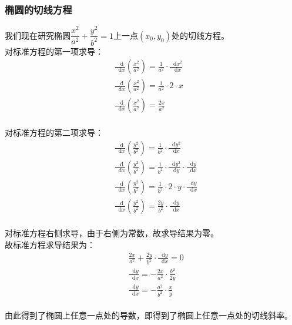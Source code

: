 \documentclass[UTF8]{ctexart}
\newcommand*{\dif}{\mathop{}\!\mathrm{d}}
\begin{document}
\newpage

\subsubsection{椭圆的切线方程}
    我们现在研究椭圆$\dfrac{x^2}{a^2}+\dfrac{y^2}{b^2}=1$上一点$(x_0,y_0)$处的切线方程。\\[5mm]
    对标准方程的第一项求导：
    \setcounter{equation}{0}
    \begin{align}
        &\frac{\dif}{\dif x}\left(\frac{x^2}{a^2}\right)=\frac{1}{a^2}\cdot\frac{\dif x^2}{\dif x}~~~~~~~~\\[4mm]
        &\frac{\dif}{\dif x}\left(\frac{x^2}{a^2}\right)=\frac{1}{a^2}\cdot 2\cdot x\\[4mm]
        &\frac{\dif}{\dif x}\left(\frac{x^2}{a^2}\right)=\frac{2x}{a^2}
    \end{align}\\
    对标准方程的第二项求导：
    \setcounter{equation}{0}
    \begin{align}
        &\frac{\dif}{\dif x}\left(\frac{y^2}{b^2}\right)=\frac{1}{b^2}\cdot\frac{\dif y^2}{\dif x}\\[4mm]
        &\frac{\dif}{\dif x}\left(\frac{y^2}{b^2}\right)=\frac{1}{b^2}\cdot\frac{\dif y^2}{\dif y}\cdot\frac{\dif y}{\dif x}\\[4mm]
        &\frac{\dif}{\dif x}\left(\frac{y^2}{b^2}\right)=\frac{1}{b^2}\cdot 2\cdot y\cdot \frac{\dif y}{\dif x}\\[4mm]
        &\frac{\dif}{\dif x}\left(\frac{y^2}{b^2}\right)=\frac{2y}{b^2}\cdot\frac{\dif y}{\dif x}
    \end{align}\\
    对标准方程右侧求导，由于右侧为常数，故求导结果为零。\\[12mm]
    故标准方程求导结果为：
    \begin{align}
        &\frac{2x}{a^2}+\frac{2y}{b^2}\cdot\frac{\dif y}{\dif x}=0\\[5mm]
        &\frac{\dif y}{\dif x}=-\frac{2x}{a^2}\cdot\frac{b^2}{2y}\\[5mm]
        &\frac{\dif y}{\dif x}=-\frac{a^2}{b^2}\cdot\frac{x}{y}
    \end{align}\\
    由此得到了椭圆上任意一点处的导数，即得到了椭圆上任意一点处的切线斜率。

\newpage
\end{document}
